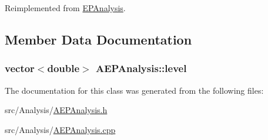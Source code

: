 Reimplemented from \hyperlink{class_e_p_analysis_a0c4270a435264c7aa18408d7f350ca31}{E\+P\+Analysis}.



\subsection{Member Data Documentation}
\hypertarget{class_a_e_p_analysis_a1a08690cf055caad8af6b95ce0e0f2c1}{
\subsubsection[{level}]{\setlength{\rightskip}{0pt plus 5cm}vector$<$double$>$ A\+E\+P\+Analysis\+::level\hspace{0.3cm}{\ttfamily [protected]}}}\label{class_a_e_p_analysis_a1a08690cf055caad8af6b95ce0e0f2c1}


The documentation for this class was generated from the following files\+:\begin{DoxyCompactItemize}
\item 
src/\+Analysis/\hyperlink{_a_e_p_analysis_8h}{A\+E\+P\+Analysis.\+h}\item 
src/\+Analysis/\hyperlink{_a_e_p_analysis_8cpp}{A\+E\+P\+Analysis.\+cpp}\end{DoxyCompactItemize}
